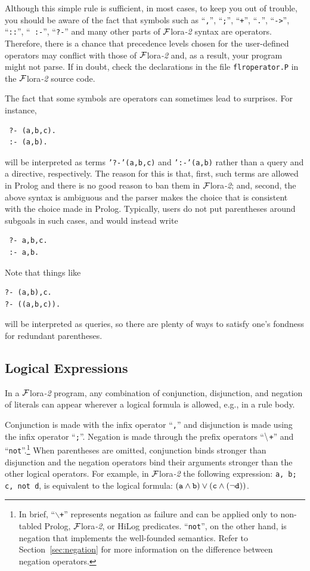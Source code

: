\documentclass[11pt]{article}
\newcommand{\FLORA}{{\mbox{\sc ${\cal F}${lora}\rm\emph{-2}}}\xspace}
\newcommand{\NAF}{\mbox{\tt \ensuremath{\tt\backslash}+}\xspace}
\newcommand{\TNOT}{{{\tt not}}\xspace}
\begin{document}
Although this simple rule is sufficient, in most cases, to keep you out of
trouble, you should be aware of the fact that symbols such as ``{\tt ,}'',
``{\tt ;}'', ``{\tt +}'', ``{\tt .}'', ``{\tt ->}'', ``{\tt ::}'', ``{\tt
  :-}'', ``{\tt ?-}'' and many
other parts of \FLORA syntax are operators. Therefore, there is a chance
that precedence levels chosen for the user-defined operators may conflict with
those of \FLORA and, as a result, your program might not parse. If in
doubt, check the declarations in the file {\tt flroperator.P} in the \FLORA
source code.

The fact that some symbols are operators can sometimes lead to
surprises. For instance,
\begin{verbatim}
 ?- (a,b,c).
 :- (a,b).
\end{verbatim}
will be interpreted as terms {\tt '?-'(a,b,c)} and {\tt ':-'(a,b)} rather
than a query and a directive, respectively. The reason for this is that,
first, such terms are allowed in Prolog and there is no good reason to ban
them in \FLORA; and, second, the above syntax is ambiguous and the parser
makes the choice that is consistent with the choice made in
Prolog. Typically, users do not put parentheses around subgoals in such
cases, and would instead write
\begin{verbatim}
 ?- a,b,c.
 :- a,b.  
\end{verbatim}
Note that things like
\begin{verbatim}
?- (a,b),c.  
?- ((a,b,c)).
\end{verbatim}
will be interpreted as queries, so there are plenty of ways to satisfy
one's fondness for redundant parentheses.


\subsection{Logical Expressions}


%
In a \FLORA program, any combination of conjunction, disjunction, and
negation of literals can appear wherever a logical formula is allowed,
e.g., in a rule body.

Conjunction is made with the infix operator ``{\tt ,}'' and
disjunction is made using the infix operator ``{\tt ;}''.  Negation is made
through the prefix operators ``\NAF'' and ``\TNOT''.\footnote{
  In brief, ``{\tt $\backslash$+}'' represents negation as
  failure and can be applied only to non-tabled Prolog, \FLORA, or HiLog
  predicates. ``\TNOT'', on the other hand, is negation that
  implements the well-founded semantics.  Refer to
  Section~\ref{sec:negation} for more information on the difference between
  negation operators. 
  }
When parentheses are omitted, conjunction binds stronger than disjunction
and the negation operators bind their arguments stronger than the other
logical operators.  For example, in \FLORA the following expression:
{\tt a, b; c, \TNOT d}, is equivalent to the logical formula: $\tt (a
\wedge b) \vee (c \wedge (\neg d))$.
\end{document}
